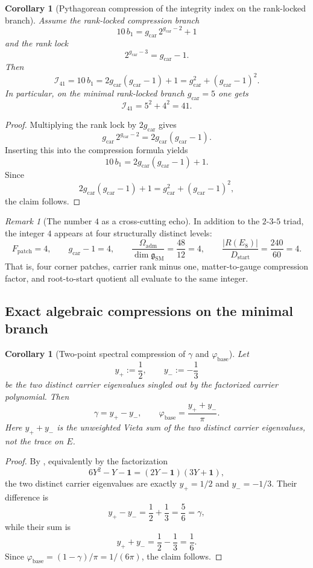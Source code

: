 \documentclass[11pt,a4paper]{article}
\newtheorem{corollary}[theorem]{Corollary}
\theoremstyle{definition}
\theoremstyle{remark}
\newtheorem*{remark}{Remark}
\newcommand{\phibase}{\varphi_{\mathrm{base}}}
\newcommand{\bone}{b_1}
\newcommand{\SM}{\mathrm{SM}}
\newcommand{\Oadm}{\Omega_{\mathrm{adm}}}
\newcommand{\gcar}{g_{\mathrm{car}}}
\newcommand{\Dstart}{D_{\mathrm{start}}}
\begin{document}
\begin{corollary}[Pythagorean compression of the integrity index on the rank-locked branch]
\label{cor:pythagorean-integrity-index}
Assume the rank-locked compression branch
\[
10\,\bone=\gcar\,2^{\gcar-2}+1
\]
and the rank lock
\[
2^{\gcar-3}=\gcar-1.
\]
Then
\[
\mathcal I_{41}
=
10\,\bone
=
2\gcar(\gcar-1)+1
=
\gcar^2+(\gcar-1)^2.
\]
In particular, on the minimal rank-locked branch $\gcar=5$ one gets
\[
\mathcal I_{41}=5^2+4^2=41.
\]
\end{corollary}

\begin{proof}
Multiplying the rank lock by $2\gcar$ gives
\[
\gcar\,2^{\gcar-2}=2\gcar(\gcar-1).
\]
Inserting this into the compression formula yields
\[
10\,\bone=2\gcar(\gcar-1)+1.
\]
Since
\[
2\gcar(\gcar-1)+1=\gcar^2+(\gcar-1)^2,
\]
the claim follows.
\end{proof}

\begin{remark}[The number $4$ as a cross-cutting echo]
In addition to the $2$-$3$-$5$ triad, the integer $4$ appears at four structurally distinct levels:
\[
F_{\mathrm{patch}}=4,
\qquad
\gcar-1=4,
\qquad
\frac{\Oadm}{\dim\mathfrak g_{\SM}}=\frac{48}{12}=4,
\qquad
\frac{|R(E_8)|}{\Dstart}=\frac{240}{60}=4.
\]
That is, four corner patches, carrier rank minus one, matter-to-gauge compression factor, and root-to-start quotient all evaluate to the same integer.
\end{remark}

\subsection{Exact algebraic compressions on the minimal branch}

\begin{corollary}[Two-point spectral compression of $\gamma$ and $\phibase$]
Let
\[
y_+:=\frac12,
\qquad
y_-:=-\frac13
\]
be the two distinct carrier eigenvalues singled out by the factorized carrier polynomial. Then
\[
\gamma=y_+-y_-,
\qquad
\phibase=\frac{y_++y_-}{\pi}.
\]
Here $y_++y_-$ is the unweighted Vieta sum of the two distinct carrier eigenvalues, not the trace on $E$.
\end{corollary}

\begin{proof}
By , equivalently by the factorization
\[
6Y^2-Y-\mathbf 1=(2Y-\mathbf 1)(3Y+\mathbf 1),
\]
the two distinct carrier eigenvalues are exactly $y_+=1/2$ and $y_-=-1/3$. Their difference is
\[
y_+-y_-=\frac12+\frac13=\frac56=\gamma,
\]
while their sum is
\[
y_++y_-=\frac12-\frac13=\frac16.
\]
Since $\phibase=(1-\gamma)/\pi=1/(6\pi)$, the claim follows.
\end{proof}
\end{document}
